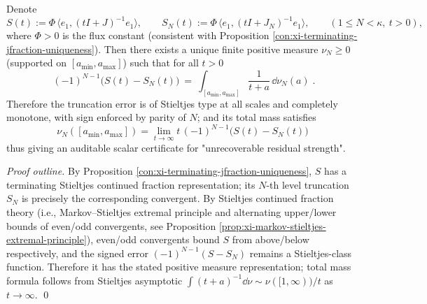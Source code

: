 \begin{proposition}\label{prop:xi-jacobi-truncation-remainder-stieltjes}
Denote
\[
S(t):=\Phi\,\langle e_1,(tI+J)^{-1}e_1\rangle,
\qquad
S_N(t):=\Phi\,\langle e_1,(tI+J_N)^{-1}e_1\rangle,
\qquad (1\le N<\kappa,\ t>0),
\]
where \(\Phi>0\) is the flux constant (consistent with Proposition \ref{con:xi-terminating-jfraction-uniqueness}).
Then there exists a unique finite positive measure \(\nu_N\ge 0\) (supported on \([a_{\min},a_{\max}]\)) such that for all \(t>0\)
\[
\boxed{\;
(-1)^{N-1}\bigl(S(t)-S_N(t)\bigr)
\ =\ \int_{[a_{\min},a_{\max}]}\frac{1}{t+a}\,\dd\nu_N(a)\; }.
\]
Therefore the truncation error is of Stieltjes type at all scales and completely monotone, with sign enforced by parity of \(N\);
and its total mass satisfies
\[
\boxed{\;
\nu_N([a_{\min},a_{\max}])
=\lim_{t\to\infty}t\,(-1)^{N-1}\bigl(S(t)-S_N(t)\bigr)\;}
\]
thus giving an auditable scalar certificate for "unrecoverable residual strength".
\end{proposition}
\begin{proof}[Proof outline]
By Proposition \ref{con:xi-terminating-jfraction-uniqueness}, \(S\) has a terminating Stieltjes continued fraction representation; its \(N\)-th level truncation \(S_N\) is precisely the corresponding convergent.
By Stieltjes continued fraction theory (i.e., Markov--Stieltjes extremal principle and alternating upper/lower bounds of even/odd convergents, see Proposition \ref{prop:xi-markov-stieltjes-extremal-principle}), even/odd convergents bound \(S\) from above/below respectively, and the signed error \((-1)^{N-1}(S-S_N)\) remains a Stieltjes-class function.
Therefore it has the stated positive measure representation; total mass formula follows from Stieltjes asymptotic \(\int (t+a)^{-1}\dd\nu\sim \nu([1,\infty))/t\) as \(t\to\infty\). \qed
\end{proof}

